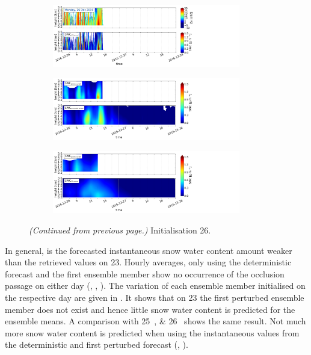 \begin{figure}\ContinuedFloat
	\centering
	\begin{subfigure}[t]{\textwidth}
		\centering
		\includegraphics[trim={0.cm 2.2cm 19.cm 0.5cm},clip,width=0.9\textwidth]{./fig_obs_ret/20161226}
		\caption{}\label{fig:SWC:ret_26}
	\end{subfigure}
	\begin{subfigure}[t]{\textwidth}
		\centering
		\includegraphics[trim={0.cm 2.2cm 19.cm 0.5cm},clip,width=0.9\textwidth]{./fig_vert_SWC_EM/20161226}
		\caption{}\label{fig:SWC_EM:26}
	\end{subfigure}
	\begin{subfigure}[t]{\textwidth}
		\centering
		\includegraphics[trim={0.cm 0.8cm 19.cm 0.5cm},clip,width=0.9\textwidth]{./fig_vert_SWC_3h/20161226}
		\caption{}\label{fig:SWC3h:26}
	\end{subfigure}
	\caption{\textit{(Continued from previous page.)} Initialisation \SI{26}{\dec}.}
\end{figure}
In general, is the forecasted instantaneous snow water content amount weaker than the retrieved values on \SI{23}{\dec}. Hourly averages, only using the deterministic forecast and the first ensemble member show no occurrence of the occlusion passage on either day (, , ). The variation of each ensemble member initialised on the respective day are given in . It shows that on \SI{23}{\dec} the first perturbed ensemble member does not exist and hence little snow water content is predicted for the ensemble means. A comparison with \SIlist{25;26}{\dec} shows the same result. Not much more snow water content is predicted when using the instantaneous values from the deterministic and first perturbed forecast (, ). 
